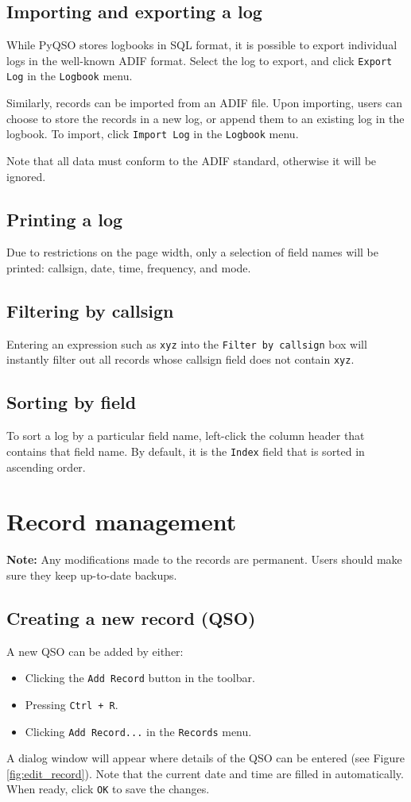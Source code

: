 \documentclass[11pt, a4paper]{report}
\begin{document}
\section{Importing and exporting a log}
While PyQSO stores logbooks in SQL format, it is possible to export individual logs in the well-known ADIF format. Select the log to export, and click \texttt{Export Log} in the \texttt{Logbook} menu.

Similarly, records can be imported from an ADIF file. Upon importing, users can choose to store the records in a new log, or append them to an existing log in the logbook. To import, click \texttt{Import Log} in the \texttt{Logbook} menu.

Note that all data must conform to the ADIF standard, otherwise it will be ignored.

\section{Printing a log}
Due to restrictions on the page width, only a selection of field names will be printed: callsign, date, time, frequency, and mode.

\section{Filtering by callsign}
Entering an expression such as \texttt{xyz} into the \texttt{Filter by callsign} box will instantly filter out all records whose callsign field does not contain \texttt{xyz}.

\section{Sorting by field}
To sort a log by a particular field name, left-click the column header that contains that field name. By default, it is the \texttt{Index} field that is sorted in ascending order.

\chapter{Record management}\label{chap:record_management}

\noindent\textbf{Note:} Any modifications made to the records are permanent. Users should make sure they keep up-to-date backups.

\section{Creating a new record (QSO)}
A new QSO can be added by either:
\begin{itemize}
  \item Clicking the \texttt{Add Record} button in the toolbar.
  \item Pressing \texttt{Ctrl + R}.
  \item Clicking \texttt{Add Record...} in the \texttt{Records} menu.
\end{itemize}
A dialog window will appear where details of the QSO can be entered (see Figure \ref{fig:edit_record}). Note that the current date and time are filled in automatically. When ready, click \texttt{OK} to save the changes.
\end{document}
